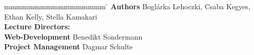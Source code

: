 \begin{titlepage}
\begin{center}
	\end{center}
	\vspace*{30mm}
	\begin{spacing}{1}
		\begin{tabbing}
				mmmmmmmmmmmmmmmmm     \= \kill
				\textbf{Authors} \>  Boglárka Lehoczki, Csaba Kegyes, Ethan Kelly, Stella Kamakari\\
				\textbf{Lecture Directors:} \> \\
				\textbf{Web-Development}      \>  Benedikt Sondermann\\
				\textbf{Project Management}              \> Dagmar Schulte\\
		\end{tabbing}
	\end{spacing}
\end{titlepage}

